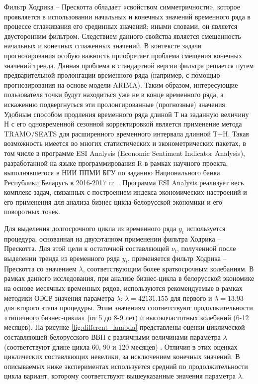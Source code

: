 \documentclass[a4paper,14pt]{extreport}
\begin{document}
	Фильтр Ходрика – Прескотта обладает «свойством симметричности», которое проявляется в использовании начальных и конечных значений временного ряда в процессе сглаживания его срединных значений; иными словами, он является двусторонним фильтром. Следствием данного свойства является смещенность начальных и конечных сглаженных значений. В контексте задачи прогнозирования особую важность приобретает проблема смещения конечных значений тренда. Данная проблема в стандартной версии фильтра решается путем предварительной пролонгации временного ряда (например, с помощью прогнозирования на основе модели ARIMA). Таким образом, интересующие пользователя точки будут находиться уже не в конце временного ряда, а искажению подвергнуться эти пролонгированные (прогнозные) значения. Удобным способом продления временного ряда длиной Т на заданную величину Н с его одновременной сезонной корректировкой является применение метода TRAMO/SEATS для расширенного временного интервала длинной Т+H. Такая возможность имеется во многих статистических и эконометрических пакетах, в том числе в программе ESI Analysis (Economic Sentiment Indicator Analysis), разработанной на языке программирования R в рамках научного проекта, выполнявшегося в НИИ ППМИ БГУ по заданию Национального банка Республики Беларусь в 2016-2017 гг. \cite{esiMaking}. Программа ESI Analysis реализует весь комплекс задач, связанных с построением индекса экономических настроений и его применения для анализа бизнес-цикла белорусской экономики и его поворотных точек.  
	
	Для выделения долгосрочного цикла из временного ряда $y_t$ используется процедура, основанная на двухэтапном применении фильтра Ходрика – Прескотта. Для этой цели к остаточной составляющей $\nu_t$, полученной после выделении тренда из временного ряда $y_t$, применяется фильтр Ходрика – Прескотта со значением $\lambda$, соответствующим более краткосрочным колебаниям. В рамках данного исследования, при анализе бизнес-цикла в белорусской экономике на основе месячных временных рядов,  используются рекомендуемые в рамках методики ОЭСР значения параметра $\lambda$:  $\lambda = 42131.155$ для первого и $\lambda = 13.93$ для второго этапа процедуры. Этим значениям соответствуют продолжительности «типичного бизнес-цикла» (от 5 до 8-9 лет) и высокочастотных колебаний (6-12 месяцев). На рисунке \ref{fig:different_lambda} представлены оценки циклической составляющей белорусского ВВП с различными величинами параметра $\lambda$ (соответствуют длине цикла 60, 90 и 120 месяцев) \cite{esiMakingAlt}. Отличия в этих оценках циклических составляющих невелики, за исключением конечных значений.  В описываемых ниже экспериментах используется средний по продолжительности цикла вариант, которому соответствуют вышеуказанные значения параметра $\lambda$.
	
\end{document}
